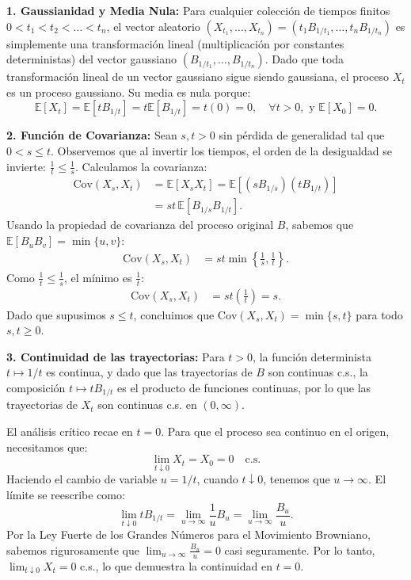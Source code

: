 \documentclass[11pt, letterpaper]{article}
\begin{document}
\begin{solucion}
    \textbf{1. Gaussianidad y Media Nula:}
    Para cualquier colección de tiempos finitos $0 < t_1 < t_2 < \dots < t_n$, el vector aleatorio $(X_{t_1}, \dots, X_{t_n}) = (t_1 B_{1/t_1}, \dots, t_n B_{1/t_n})$ es simplemente una transformación lineal (multiplicación por constantes deterministas) del vector gaussiano $(B_{1/t_1}, \dots, B_{1/t_n})$.
    Dado que toda transformación lineal de un vector gaussiano sigue siendo gaussiana, el proceso $X_t$ es un proceso gaussiano.
    Su media es nula porque:
    \[ \mathbb{E}[X_t] = \mathbb{E}[t B_{1/t}] = t \mathbb{E}[B_{1/t}] = t(0) = 0, \quad \forall t > 0, \text{ y } \mathbb{E}[X_0] = 0. \]

    \textbf{2. Función de Covarianza:}
    Sean $s, t > 0$ sin pérdida de generalidad tal que $0 < s \le t$. Observemos que al invertir los tiempos, el orden de la desigualdad se invierte: $\frac{1}{t} \le \frac{1}{s}$.
    Calculamos la covarianza:
    \begin{align*}
        \text{Cov}(X_s, X_t) &= \mathbb{E}[X_s X_t] = \mathbb{E} \left[ \left( s B_{1/s} \right) \left( t B_{1/t} \right) \right] \\
        &= st \, \mathbb{E} \left[ B_{1/s} B_{1/t} \right].
    \end{align*}
    Usando la propiedad de covarianza del proceso original $B$, sabemos que $\mathbb{E}[B_u B_v] = \min\{u, v\}$:
    \begin{align*}
        \text{Cov}(X_s, X_t) &= st \min\left\{ \frac{1}{s}, \frac{1}{t} \right\}.
    \end{align*}
    Como $\frac{1}{t} \le \frac{1}{s}$, el mínimo es $\frac{1}{t}$:
    \begin{align*}
        \text{Cov}(X_s, X_t) &= st \left( \frac{1}{t} \right) = s.
    \end{align*}
    Dado que supusimos $s \le t$, concluimos que $\text{Cov}(X_s, X_t) = \min\{s, t\}$ para todo $s, t \ge 0$.

    \textbf{3. Continuidad de las trayectorias:}
    Para $t > 0$, la función determinista $t \mapsto 1/t$ es continua, y dado que las trayectorias de $B$ son continuas c.s., la composición $t \mapsto t B_{1/t}$ es el producto de funciones continuas, por lo que las trayectorias de $X_t$ son continuas c.s. en $(0, \infty)$.
    
    El análisis crítico recae en $t=0$. Para que el proceso sea continuo en el origen, necesitamos que:
    \[ \lim_{t \downarrow 0} X_t = X_0 = 0 \quad \text{c.s.} \]
    Haciendo el cambio de variable $u = 1/t$, cuando $t \downarrow 0$, tenemos que $u \to \infty$. El límite se reescribe como:
    \[ \lim_{t \downarrow 0} t B_{1/t} = \lim_{u \to \infty} \frac{1}{u} B_u = \lim_{u \to \infty} \frac{B_u}{u}. \]
    Por la Ley Fuerte de los Grandes Números para el Movimiento Browniano, sabemos rigurosamente que $\lim_{u \to \infty} \frac{B_u}{u} = 0$ casi seguramente.
    Por lo tanto, $\lim_{t \downarrow 0} X_t = 0$ c.s., lo que demuestra la continuidad en $t=0$.


\end{solucion}
\end{document}
